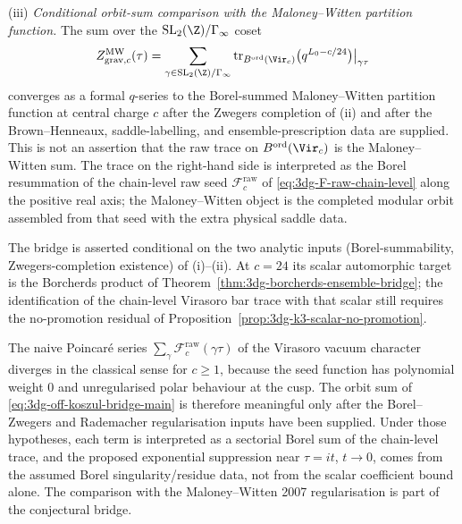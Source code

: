 \begin{conjecture}
\textup{(iii)} \emph{Conditional orbit-sum comparison with the
Maloney--Witten partition function.}
The sum over the $\mathrm{SL}_{2}(\Z)/\Gamma_{\infty}$ coset
\begin{equation}
\label{eq:3dg-off-koszul-bridge-main}
Z^{\mathrm{MW}}_{\mathrm{grav},c}(\tau)
= \sum_{\gamma \in \mathrm{SL}_{2}(\Z)/\Gamma_{\infty}}
\mathrm{tr}_{B^{\mathrm{ord}}(\Vir_{c})}
\bigl(q^{L_{0} - c/24}\bigr)\big|_{\gamma\tau}
\end{equation}
converges as a formal $q$-series to the Borel-summed Maloney--Witten
partition function at central charge $c$ after the Zwegers completion
of \textup{(ii)} and after the Brown--Henneaux, saddle-labelling, and
ensemble-prescription data are supplied. This is not an assertion that
the raw trace on \(B^{\mathrm{ord}}(\Vir_c)\) is the
Maloney--Witten sum. The trace on the right-hand side is interpreted as
the Borel resummation of the chain-level raw seed
$\mathcal F^{\mathrm{raw}}_{c}$ of \eqref{eq:3dg-F-raw-chain-level}
along the positive real axis; the Maloney--Witten object is the
completed modular orbit assembled from that seed with the extra
physical saddle data.

The bridge is asserted conditional on the two analytic inputs
\textup{(Borel-summability, Zwegers-completion existence)} of
\textup{(i)}--\textup{(ii)}. At \(c=24\) its scalar automorphic
target is the Borcherds product of
Theorem~\ref{thm:3dg-borcherds-ensemble-bridge}; the identification
of the chain-level Virasoro bar trace with that scalar still requires
the no-promotion residual of
Proposition~\ref{prop:3dg-k3-scalar-no-promotion}.
\end{conjecture}

\begin{remark}
\label{rem:3dg-off-koszul-sl2-orbit-convergence}
%
The naive Poincar\'e series
$\sum_{\gamma} \mathcal F^{\mathrm{raw}}_{c}(\gamma\tau)$ of the
Virasoro vacuum character diverges in the classical sense for
$c \ge 1$, because the seed function has polynomial weight $0$ and
unregularised polar behaviour at the cusp. The orbit sum of
\eqref{eq:3dg-off-koszul-bridge-main} is therefore meaningful only
after the Borel--Zwegers and Rademacher regularisation inputs have
been supplied. Under those hypotheses, each term is interpreted as a
sectorial Borel sum of the chain-level trace, and the proposed
exponential suppression near \(\tau=it\), \(t\to0\), comes from the
assumed Borel singularity/residue data, not from the scalar coefficient
bound alone. The comparison with the Maloney--Witten 2007
regularisation is part of the conjectural bridge.
\end{remark}

